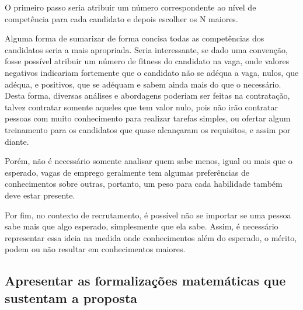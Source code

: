 \documentclass[preprint,12pt]{elsarticle}
\begin{document}
O primeiro passo seria atribuir um número correspondente ao nível de competência para cada candidato e depois escolher os N maiores. 

Alguma forma de sumarizar de forma concisa todas as competências dos candidatos seria a mais apropriada. Seria interessante, se dado uma convenção, fosse possível atribuir um número de fitness do candidato na vaga, onde valores negativos indicariam fortemente que o candidato não se adéqua a vaga, nulos, que adéqua, e positivos, que se adéquam e sabem ainda mais do que o necessário. Desta forma, diversas análises e abordagens poderiam ser feitas na contratação, talvez contratar somente aqueles que tem valor nulo, pois não irão contratar pessoas com muito conhecimento para realizar tarefas simples, ou ofertar algum treinamento para os candidatos que quase alcançaram os requisitos, e assim por diante.

Porém, não é necessário somente analisar quem sabe menos, igual ou mais que o esperado, vagas de emprego geralmente tem algumas preferências de conhecimentos sobre outras, portanto, um peso para cada habilidade também deve estar presente. 

Por fim, no contexto de recrutamento, é possível não se importar se uma pessoa sabe mais que algo esperado, simplesmente que ela sabe. Assim, é necessário representar essa ideia na medida onde conhecimentos além do esperado, o mérito, podem ou não resultar em conhecimentos maiores.

\subsection{Apresentar as formalizações matemáticas que sustentam a proposta}
\end{document}
